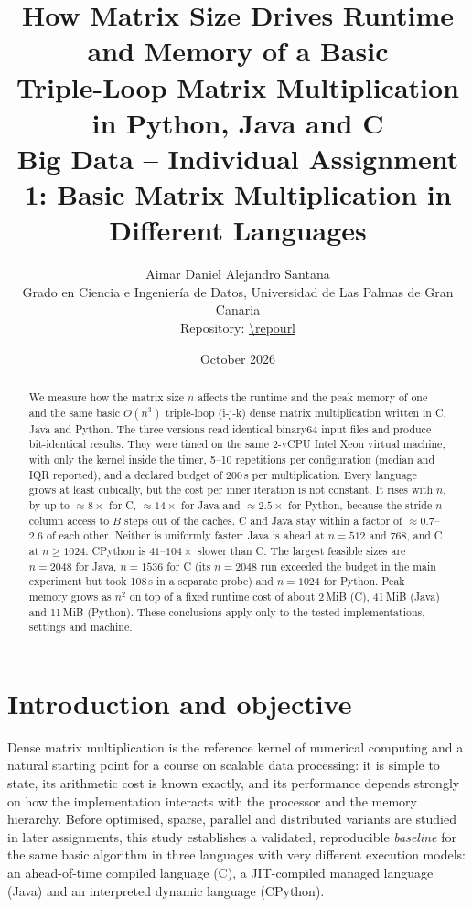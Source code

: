 \documentclass[10pt,a4paper]{article}
\title{\textbf{How Matrix Size Drives Runtime and Memory of a Basic\\
Triple-Loop Matrix Multiplication in Python, Java and C}\\[4pt]
\large Big Data -- Individual Assignment 1: Basic Matrix Multiplication in Different Languages}
\author{Aimar Daniel Alejandro Santana\\
Grado en Ciencia e Ingeniería de Datos, Universidad de Las Palmas de Gran Canaria\\
\small Repository: \url{\repourl}}
\date{October 2026}
\begin{document}
\maketitle

\begin{abstract}
We measure how the matrix size $n$ affects the runtime and the peak memory of one and the
same basic $O(n^3)$ triple-loop (i-j-k) dense matrix multiplication written in C, Java and
Python. The three versions read identical binary64 input files and produce bit-identical
results. They were timed on the same 2-vCPU Intel Xeon virtual machine, with only the kernel
inside the timer, 5--10 repetitions per configuration (median and IQR reported), and a declared
budget of 200\,s per multiplication. Every language grows at least cubically, but the cost per
inner iteration is not constant. It rises with $n$, by up to $\approx 8\times$ for C, $\approx 14\times$ for Java and
$\approx 2.5\times$ for Python, because the stride-$n$ column access to $B$ steps out of the
caches. C and Java stay within a factor of $\approx 0.7$--$2.6$ of each other. Neither is
uniformly faster: Java is ahead at $n=512$ and $768$, and C at $n\ge1024$. CPython is
$41$--$104\times$ slower than C. The largest feasible sizes are $n=2048$ for Java,
$n=1536$ for C (its $n=2048$ run exceeded the budget in the main experiment but took 108\,s in a
separate probe) and $n=1024$ for Python. Peak memory grows as $n^2$ on top of a fixed runtime
cost of about 2\,MiB (C), 41\,MiB (Java) and 11\,MiB (Python). These conclusions apply only to
the tested implementations, settings and machine.
\end{abstract}

\section{Introduction and objective}
Dense matrix multiplication is the reference kernel of numerical computing and a natural
starting point for a course on scalable data processing: it is simple to state, its
arithmetic cost is known exactly, and its performance depends strongly on how the
implementation interacts with the processor and the memory hierarchy. Before optimised,
sparse, parallel and distributed variants are studied in later assignments, this study
establishes a validated, reproducible \emph{baseline} for the same basic algorithm in three
languages with very different execution models: an ahead-of-time compiled language (C), a
JIT-compiled managed language (Java) and an interpreted dynamic language (CPython).
\end{document}
